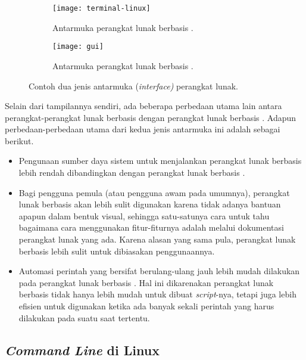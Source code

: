 \begin{figure}[ht]
    \begin{subfigure}[b]{0.45\linewidth}
		\centering
		\texttt{[image: terminal-linux]}
		\caption{Antarmuka perangkat lunak berbasis \cli.}
		\label{fig:commandline-cli}
	\end{subfigure}
	\hfill
    \begin{subfigure}[b]{0.5\linewidth}
		\centering
		\texttt{[image: gui]}
		\caption{Antarmuka perangkat lunak berbasis \gui.}
		\label{fig:commandline-gui}
	\end{subfigure}
    \caption[Dua jenis tampilan perangkat lunak]{Contoh dua jenis antarmuka (\textit{interface)} perangkat lunak.}
	\label{fig:commandline-interfacetypes}
\end{figure}

Selain dari tampilannya sendiri, ada beberapa perbedaan utama lain antara perangkat-perangkat lunak berbasis \cli dengan perangkat lunak berbasis \gui. Adapun perbedaan-perbedaan utama dari kedua jenis antarmuka ini adalah sebagai berikut.\cite{mueller:2007:windowscommandline}
\begin{itemize}
	\item Pengunaan sumber daya sistem untuk menjalankan perangkat lunak berbasis \cli lebih rendah dibandingkan dengan perangkat lunak berbasis \gui.
	\item Bagi pengguna pemula (atau pengguna awam pada umumnya), perangkat lunak berbasis \cli akan lebih sulit digunakan karena tidak adanya bantuan apapun dalam bentuk visual, sehingga satu-satunya cara untuk tahu bagaimana cara menggunakan fitur-fiturnya adalah melalui dokumentasi perangkat lunak yang ada. Karena alasan yang sama pula, perangkat lunak berbasis \cli lebih sulit untuk dibiasakan penggunaannya.
	\item Automasi perintah yang bersifat berulang-ulang jauh lebih mudah dilakukan pada perangkat lunak berbasis \cli. Hal ini dikarenakan perangkat lunak berbasis \cli tidak hanya lebih mudah untuk dibuat \textit{script}-nya, tetapi juga lebih efisien untuk digunakan ketika ada banyak sekali perintah yang harus dilakukan pada suatu saat tertentu.
\end{itemize}

\subsection{\textit{Command Line} di Linux}
\label{sec:commandline-linux}

